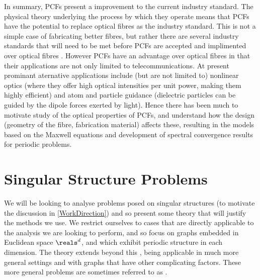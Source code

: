 In summary, PCFs present a  improvement to the current industry standard.
The physical theory underlying the process by which they operate means that PCFs have the potential to replace optical fibres as the industry standard.
This is not a simple case of fabricating better fibres, but rather there are several industry standards that will need to be met before PCFs are accepted and implimented over optical fibres \cite{knight2003photonic}.
However PCFs have an advantage over optical fibres in that their applications are not only limited to telecommunications.
At present prominant aternative applications include (but are not limited to) nonlinear optics (where they offer high optical intensities per unit power, making them highly efficient) and atom and particle guidance (dielectric particles can be guided by the dipole forces exerted by light).
Hence there has been much to motivate study of the optical properties of PCFs, and understand how the design (geometry of the fibre, fabrication material) affects these, resulting in the models based on the Maxwell equations and development of spectral convergence results for periodic problems.

\section{Singular Structure Problems} \label{sec:GraphPrelims}
We will be looking to analyse problems posed on singular structures (to motivate the discussion in \cref{WorkDirection}) and so present some theory that will justify the methods we use.
We restrict ourselves to cases that are directly applicable to the analysis we are looking to perform, and so focus on graphs embedded in Euclidean space $\reals^{d}$, and which exhibit periodic structure in each dimension. 
The theory extends beyond this \cite{kuchment2013introduction}, being applicable in much more general settings and with graphs that have other complicating factors.
These more general problems are sometimes referred to as . \newline

